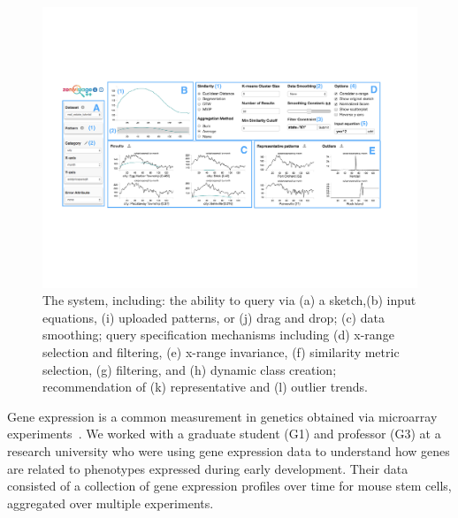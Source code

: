 \begin{figure}[ht!]
  \centering
  \vspace{-5pt}
  \includegraphics[width=0.95\linewidth]{figures/zvpp_system.pdf} %
  \vspace{-5pt}\caption{The \zvpp system, including: the ability to query via (a) a sketch,(b) input equations, (i) uploaded patterns, or (j) drag and drop; (c) data smoothing; query specification mechanisms including (d) x-range selection and filtering, (e) x-range invariance, (f) similarity metric selection, (g) filtering, and (h) dynamic class creation; recommendation of (k) representative and (l) outlier trends.} %
  \label{zvOverview}
  \vspace{-5pt}
\end{figure}
\par\noindent{} Gene expression is a common measurement in genetics obtained via microarray experiments~\cite{Peng2016}.  We worked with a graduate student (G1) and professor (G3) at a research university who were using gene expression data to understand how genes are related to phenotypes expressed during early development. Their data consisted of a collection of gene expression profiles over time for mouse stem cells, aggregated over multiple experiments. %
